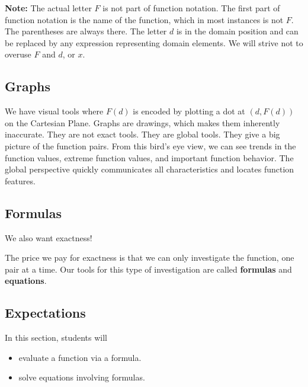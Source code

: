 \documentclass{ximera}
\begin{document}
\textbf{Note:}  The actual letter $F$ is not part of function notation.  The first part of function notation is the name of the function, which in most instances is not $F$. The parentheses are always there.  The letter $d$ is in the domain position and can be replaced by any expression representing domain elements.  We will strive not to overuse $F$ and $d$, or $x$.










\subsection{Graphs}

We have visual tools where $F(d)$ is encoded by plotting a dot at $(d, F(d))$ on the Cartesian Plane.  Graphs are drawings, which makes them inherently inaccurate.  They are not exact tools.  They are global tools.  They give a big picture of the function pairs.  From this bird's eye view, we can see trends in the function values, extreme function values, and important function behavior. The global perspective quickly communicates all characteristics and locates function features.












\subsection{Formulas}
We also want exactness!

The price we pay for exactness is that we can only investigate the function, one pair at a time.  Our tools for this type of investigation are called \textbf{formulas} and \textbf{equations}.








\subsection{Expectations}

\begin{sectionOutcomes}
In this section, students will 

\begin{itemize}
\item evaluate a function via a formula.
\item solve equations involving formulas.
\end{itemize}
\end{sectionOutcomes}
\end{document}
